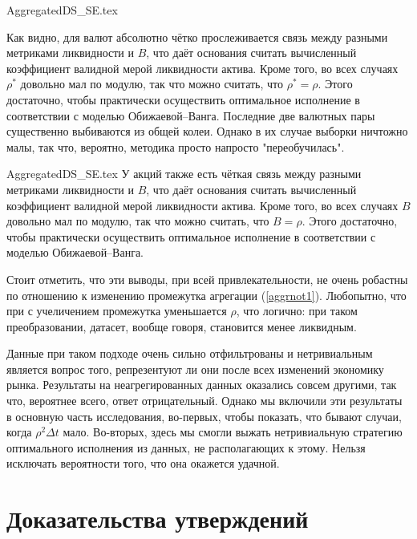 {AggregatedDS_SE.tex}

Как видно, для валют абсолютно чётко прослеживается связь между разными метриками ликвидности и $B$,
что даёт основания считать вычисленный коэффициент валидной мерой ликвидности актива. Кроме того, 
во всех случаях $\rho^*$ довольно мал по модулю, так что можно считать, что $\rho^* = \rho$. 
Этого достаточно,
чтобы практически осуществить оптимальное исполнение в соответствии с моделью Обижаевой--Ванга.
Последние две валютных пары существенно выбиваются из общей колеи. 
Однако в их случае выборки ничтожно малы,
так что, вероятно, методика просто напросто "переобучилась".
\par
{AggregatedDS_SE.tex}
У акций также есть чёткая связь между разными метриками ликвидности и $B$,
что даёт основания считать вычисленный коэффициент валидной мерой ликвидности актива. Кроме того, 
во всех случаях $B$ довольно мал по модулю, так что можно считать, что $B = \rho$. Этого достаточно,
чтобы практически осуществить оптимальное исполнение в соответствии с моделью Обижаевой--Ванга.
\par
Стоит отметить, что эти выводы, при всей привлекательности, не очень робастны по отношению к изменению промежутка 
агрегации (\ref{aggrnot1}). Любопытно, что при с учеличением промежутка уменьшается $\rho$, что логично:
при таком преобразовании, датасет, вообще говоря, становится менее ликвидным.
\par
Данные при таком подходе очень сильно отфильтрованы и нетривиальным является вопрос того,
репрезентуют ли они после всех изменений экономику рынка. Результаты на неагрегированных 
данных оказались совсем другими, так что, вероятнее всего, ответ отрицательный. Однако мы
включили эти результаты в основную часть исследования, во-первых, чтобы показать, что 
бывают случаи, когда $\rho^2 \Delta t$ мало. Во-вторых, здесь мы смогли выжать нетривиальную стратегию
оптимального исполнения из данных, не располагающих к этому. Нельзя исключать вероятности того,
что она окажется удачной.

\section{Доказательства утверждений} \label{proofs}

